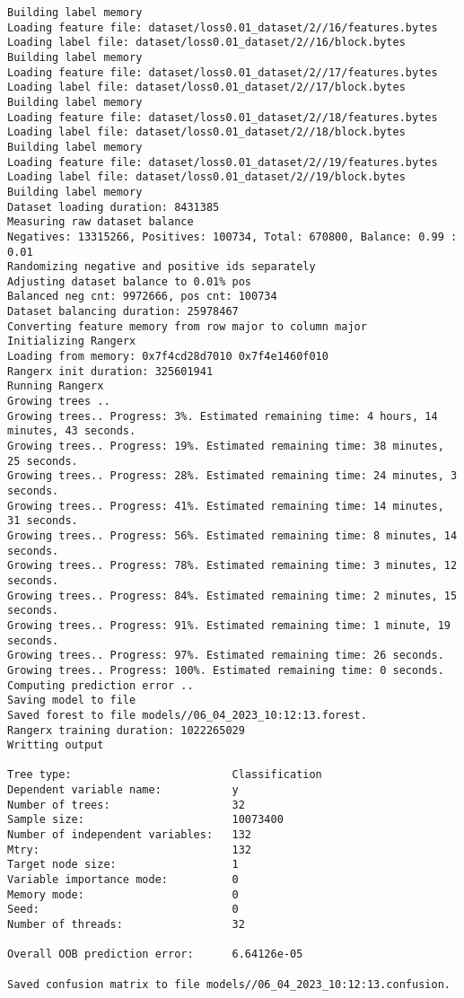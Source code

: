\documentclass[12pt,oneside]{book}
\begin{document}
\begin{lstlisting}
Building label memory
Loading feature file: dataset/loss0.01_dataset/2//16/features.bytes
Loading label file: dataset/loss0.01_dataset/2//16/block.bytes
Building label memory
Loading feature file: dataset/loss0.01_dataset/2//17/features.bytes
Loading label file: dataset/loss0.01_dataset/2//17/block.bytes
Building label memory
Loading feature file: dataset/loss0.01_dataset/2//18/features.bytes
Loading label file: dataset/loss0.01_dataset/2//18/block.bytes
Building label memory
Loading feature file: dataset/loss0.01_dataset/2//19/features.bytes
Loading label file: dataset/loss0.01_dataset/2//19/block.bytes
Building label memory
Dataset loading duration: 8431385
Measuring raw dataset balance
Negatives: 13315266, Positives: 100734, Total: 670800, Balance: 0.99 : 0.01
Randomizing negative and positive ids separately
Adjusting dataset balance to 0.01% pos
Balanced neg cnt: 9972666, pos cnt: 100734
Dataset balancing duration: 25978467
Converting feature memory from row major to column major
Initializing Rangerx
Loading from memory: 0x7f4cd28d7010 0x7f4e1460f010
Rangerx init duration: 325601941
Running Rangerx
Growing trees ..
Growing trees.. Progress: 3%. Estimated remaining time: 4 hours, 14 minutes, 43 seconds.
Growing trees.. Progress: 19%. Estimated remaining time: 38 minutes, 25 seconds.
Growing trees.. Progress: 28%. Estimated remaining time: 24 minutes, 3 seconds.
Growing trees.. Progress: 41%. Estimated remaining time: 14 minutes, 31 seconds.
Growing trees.. Progress: 56%. Estimated remaining time: 8 minutes, 14 seconds.
Growing trees.. Progress: 78%. Estimated remaining time: 3 minutes, 12 seconds.
Growing trees.. Progress: 84%. Estimated remaining time: 2 minutes, 15 seconds.
Growing trees.. Progress: 91%. Estimated remaining time: 1 minute, 19 seconds.
Growing trees.. Progress: 97%. Estimated remaining time: 26 seconds.
Growing trees.. Progress: 100%. Estimated remaining time: 0 seconds.
Computing prediction error ..
Saving model to file
Saved forest to file models//06_04_2023_10:12:13.forest.
Rangerx training duration: 1022265029
Writting output

Tree type:                         Classification
Dependent variable name:           y
Number of trees:                   32
Sample size:                       10073400
Number of independent variables:   132
Mtry:                              132
Target node size:                  1
Variable importance mode:          0
Memory mode:                       0
Seed:                              0
Number of threads:                 32

Overall OOB prediction error:      6.64126e-05

Saved confusion matrix to file models//06_04_2023_10:12:13.confusion.
\end{lstlisting}
\end{document}
